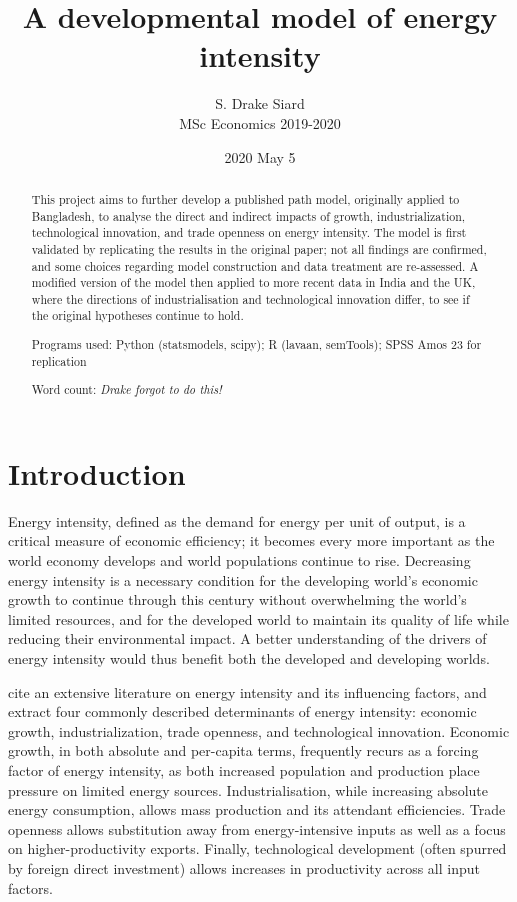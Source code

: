 \documentclass[11pt,a4paper]{article}
\title{\textbf{A developmental model of energy intensity}}
\author{S. Drake Siard\\
MSc Economics 2019-2020}
\date{2020 May 5}
\newcommand{\pkg}[1]{{\fontseries{b}\selectfont #1}}
\begin{document}
\maketitle

\begin{abstract}
This project aims to further develop a published path model, originally applied to Bangladesh, to analyse the direct and indirect impacts of growth, industrialization, technological innovation, and trade openness on energy intensity.
The model is first validated by replicating the results in the original paper; not all findings are confirmed, and some choices regarding model construction and data treatment are re-assessed.
A modified version of the model then applied to more recent data in India and the UK, where the directions of industrialisation and technological innovation differ, to see if the original hypotheses continue to hold.

Programs used: Python (\pkg{statsmodels}, \pkg{scipy}); R (\pkg{lavaan}, \pkg{semTools}); SPSS Amos 23 for replication

Word count: \em{Drake forgot to do this!}
 
\end{abstract}

\tableofcontents

\pagebreak

\section{Introduction}\label{sec:introduction}

Energy intensity, defined as the demand for energy per unit of output, is a critical measure of economic efficiency; it becomes every more important as the world economy develops and world populations continue to rise.
Decreasing energy intensity is a necessary condition for the developing world's economic growth to continue through this century without overwhelming the world's limited resources, and for the developed world to maintain its quality of life while reducing their environmental impact.
A better understanding of the drivers of energy intensity would thus benefit both the developed and developing worlds.

\cite{panHowIndustrializationTrade2019} cite an extensive literature on energy intensity and its influencing factors, and extract four commonly described determinants of energy intensity: economic growth, industrialization, trade openness, and technological innovation.
Economic growth, in both absolute and per-capita terms, frequently recurs as a forcing factor of energy intensity, as both increased population and production place pressure on limited energy sources.
Industrialisation, while increasing absolute energy consumption, allows mass production and its attendant efficiencies.
Trade openness allows substitution away from energy-intensive inputs as well as a focus on higher-productivity exports. 
Finally, technological development (often spurred by foreign direct investment) allows increases in productivity across all input factors.
\end{document}
